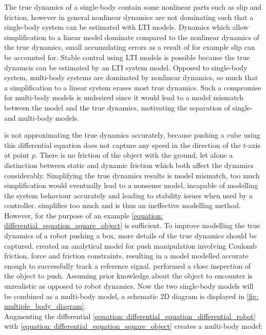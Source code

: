The true dynamics of a single-body contain some nonlinear parts such as slip and friction, however in general nonlinear dynamics are not dominating such that a single-body system can be estimated with \ac{LTI} models. Dynamics which allow simplification to a linear model dominate compared to the nonlinear dynamics of the true dynamics, small accumulating errors as a result of for example slip can be accounted for. Stable control using \ac{LTI} models is possible because the true dynamcis can be estimated by an \ac{LTI} system model. Opposed to single-body system, multi-body systems are dominated by nonlinear dynamics, so much that a simplification to a linear system erases most true dynamics. Such a compromise for multi-body models is undesired since it would lead to a model mismatch between the model and the true dynamics, motivating the separation of single- and multi-body models.

 is not approximating the true dynamics accurately, because pushing a cube using this differential equation does not capture any speed in the direction of the $t$-axis at point $p$. There is no friction of the object with the ground, let alone a distinction between static and dynamic friction which both affect the dynamics considerably. Simplifying the true dynamics results is model mismatch, too much simplification would eventually lead to a nonsense model, incapable of modelling the system behaviour accurately and leading to stability issues when used by a controller.  simplifies too much and is thus an ineffective modelling method. However, for the purpose of an example \cref{equation: differential_equation_square_object} is sufficient. To improve modelling the true dynamics of a robot pushing a box, more details of the true dynamics should be captured. \cite{bauza_dataefficient_2018} created an analytical model for push manipulation involving Coulomb friction, force and friction constraints, resulting in a model modelled accurate enough to successfully track a reference signal. \cite{bauza_dataefficient_2018} performed a close inspection of the object to push. Assuming prior knowledge about the object to encounter is unrealistic as opposed to robot dynamics. Now the two single-body models will be combined as a multi-body model, a schematic 2D diagram is displayed in \cref{fig: multiple_body_diagram}. \\


Augmenting the differential \cref{equation: differential_equation_differential_robot} with \cref{equation: differential_equation_square_object} creates a multi-body model:


